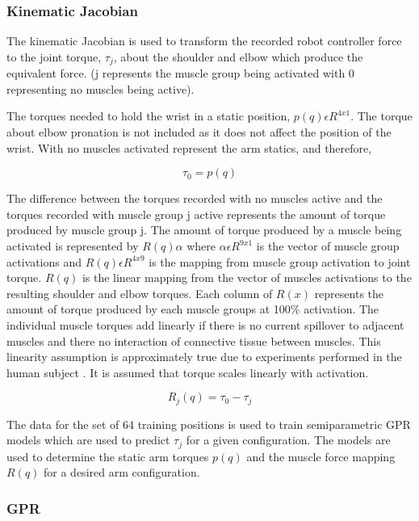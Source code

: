 \subsubsection{Kinematic Jacobian}
The kinematic Jacobian is used to transform the recorded robot controller force to the joint torque, $\tau_j$, about the shoulder and elbow which produce the equivalent force. (j represents the muscle group being activated with 0 representing no muscles being active).

The torques needed to hold the wrist in a static position, $p(q) \epsilon R^{4x1}$. The torque about elbow pronation is not included as it does not affect the position of the wrist. With no muscles activated represent the arm statics, and therefore, 

\begin{equation}
    \tau_0 = p(q)
\end{equation}

The difference between the torques recorded with no muscles active and the torques recorded with muscle group j active represents the amount of torque produced by muscle group j. The amount of torque produced by a muscle being activated is represented by $R(q)\alpha$ where $\alpha \epsilon R^{9x1}$ is the vector of muscle group activations and $R(q) \epsilon R^{4x9}$ is the mapping from muscle group activation to joint torque. $R(q)$ is the linear mapping from the vector of muscles activations to the resulting shoulder and elbow torques. Each column of $R(x)$ represents the amount of torque produced by each muscle groups at 100\% activation. The individual muscle torques add linearly if there is no current spillover to adjacent muscles and there no interaction of connective tissue between muscles. This linearity assumption is approximately true due to experiments performed in the human subject \cite{SPI}. It is assumed that torque scales linearly with activation. 

\begin{equation}
    R_j(q) = \tau_0 - \tau_j
\end{equation}

The data for the set of 64 training positions is used to train semiparametric GPR models which are used to predict $\tau_j$ for a given configuration. The models are used to determine the static arm torques $p(q)$ and the muscle force mapping $R(q)$ for a desired arm configuration.

\subsubsection{GPR}

